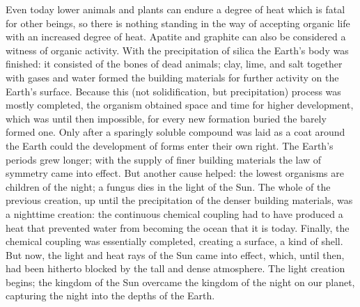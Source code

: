 \documentclass[a4paper, 11pt, oneside]{article}
\begin{document}
Even today lower animals and plants can endure a degree of heat which is fatal for other beings, so there is nothing standing in the way of accepting organic life with an increased degree of heat. Apatite and graphite can also be considered a witness of organic activity. With the precipitation of silica the Earth's body was finished: it consisted of the bones of dead animals; clay, lime, and salt together with gases and water formed the building materials for further activity on the Earth's surface. Because this (not solidification, but precipitation) process was mostly completed, the organism obtained space and time for higher development, which was until then impossible, for every new formation buried the barely formed one. Only after a sparingly soluble compound was laid as a coat around the Earth could the development of forms enter their own right. The Earth's periods grew longer; with the supply of finer building materials the law of symmetry came into effect. But another cause helped: the lowest organisms are children of the night; a fungus dies in the light of the Sun. The whole of the previous creation, up until the precipitation of the denser building materials, was a nighttime creation: the continuous chemical coupling had to have produced a heat that prevented water from becoming the ocean that it is today. Finally, the chemical coupling was essentially completed, creating a surface, a kind of shell. But now, the light and heat rays of the Sun came into effect, which, until then, had been hitherto blocked by the tall and dense atmosphere. The light creation begins; the kingdom of the Sun overcame the kingdom of the night on our planet, capturing the night into the depths of the Earth.
\end{document}
